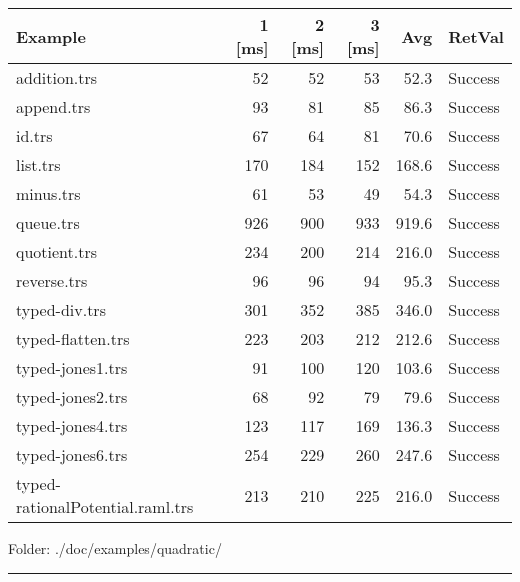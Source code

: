 \documentclass[11pt]{article}
\begin{document}
\begin{center}
\begin{tabular}{lrrrrl}
\hline
Example & 1 [ms] & 2 [ms] & 3 [ms] & Avg & RetVal\\
\hline
addition.trs & 52 & 52 & 53 & 52.3 & Success\\
append.trs & 93 & 81 & 85 & 86.3 & Success\\
id.trs & 67 & 64 & 81 & 70.6 & Success\\
list.trs & 170 & 184 & 152 & 168.6 & Success\\
minus.trs & 61 & 53 & 49 & 54.3 & Success\\
queue.trs & 926 & 900 & 933 & 919.6 & Success\\
quotient.trs & 234 & 200 & 214 & 216.0 & Success\\
reverse.trs & 96 & 96 & 94 & 95.3 & Success\\
typed-div.trs & 301 & 352 & 385 & 346.0 & Success\\
typed-flatten.trs & 223 & 203 & 212 & 212.6 & Success\\
typed-jones1.trs & 91 & 100 & 120 & 103.6 & Success\\
typed-jones2.trs & 68 & 92 & 79 & 79.6 & Success\\
typed-jones4.trs & 123 & 117 & 169 & 136.3 & Success\\
typed-jones6.trs & 254 & 229 & 260 & 247.6 & Success\\
typed-rationalPotential.raml.trs & 213 & 210 & 225 & 216.0 & Success\\
\hline
\end{tabular}

\end{center}

Folder: ./doc/examples/quadratic/

\rule{\linewidth}{0.5pt}
\end{document}
